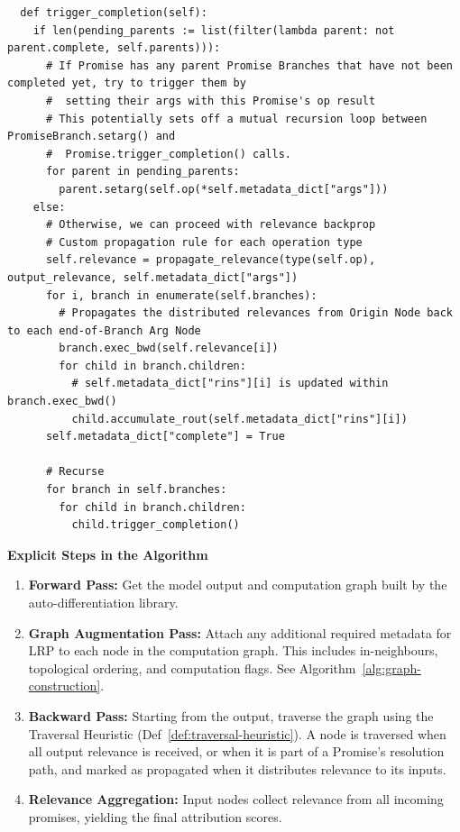 \documentclass{article}
\begin{document}
\begin{verbatim}
  def trigger_completion(self):
    if len(pending_parents := list(filter(lambda parent: not parent.complete, self.parents))):
      # If Promise has any parent Promise Branches that have not been completed yet, try to trigger them by
      #  setting their args with this Promise's op result
      # This potentially sets off a mutual recursion loop between PromiseBranch.setarg() and
      #  Promise.trigger_completion() calls.
      for parent in pending_parents:
        parent.setarg(self.op(*self.metadata_dict["args"]))
    else:
      # Otherwise, we can proceed with relevance backprop
      # Custom propagation rule for each operation type
      self.relevance = propagate_relevance(type(self.op), output_relevance, self.metadata_dict["args"])
      for i, branch in enumerate(self.branches):
        # Propagates the distributed relevances from Origin Node back to each end-of-Branch Arg Node
        branch.exec_bwd(self.relevance[i])
        for child in branch.children:
          # self.metadata_dict["rins"][i] is updated within branch.exec_bwd()
          child.accumulate_rout(self.metadata_dict["rins"][i])
      self.metadata_dict["complete"] = True

      # Recurse
      for branch in self.branches:
        for child in branch.children:
          child.trigger_completion()

\end{verbatim}

\textbf{Explicit Steps in the Algorithm}
\begin{enumerate}
  \item \textbf{Forward Pass:} Get the model output and computation graph built by the auto-differentiation library.
  \item \textbf{Graph Augmentation Pass:} Attach any additional required metadata for LRP to each node in the computation graph. This includes in-neighbours, topological ordering, and computation flags. See Algorithm~\ref{alg:graph-construction}.
  \item \textbf{Backward Pass:} Starting from the output, traverse the graph using the Traversal Heuristic (Def~\ref{def:traversal-heuristic}). A node is traversed when all output relevance is received, or when it is part of a Promise's resolution path, and marked as propagated when it distributes relevance to its inputs.
  \item \textbf{Relevance Aggregation:} Input nodes collect relevance from all incoming promises, yielding the final attribution scores.
\end{enumerate}
\end{document}
